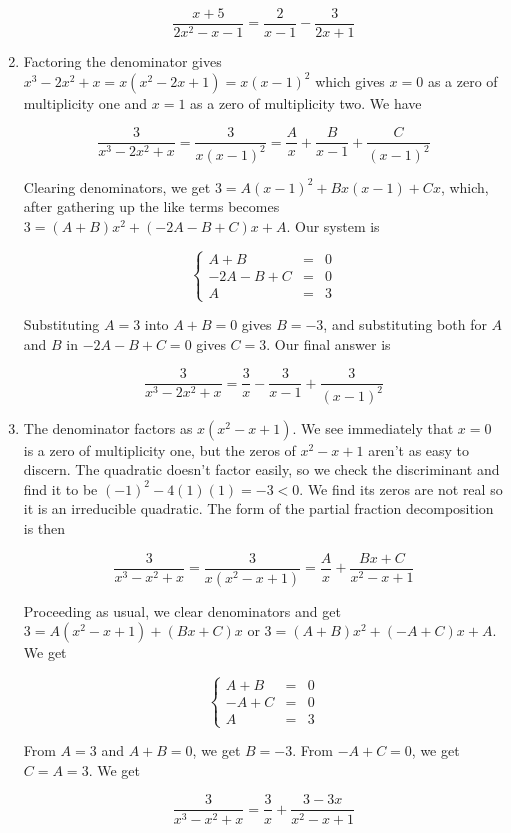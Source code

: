 \begin{ex}
\begin{enumerate}
\[\dfrac{x+5}{2x^2-x-1} = \dfrac{2}{x-1} -\dfrac{3}{2x+1} \]

\item  Factoring the denominator gives $x^3-2x^2+x = x\left(x^2-2x+1\right) = x(x-1)^2$ which gives $x=0$ as a zero of multiplicity one and $x=1$ as a zero of multiplicity two. We have

\[ \dfrac{3}{x^3-2x^2+x} = \dfrac{3}{x(x-1)^2} = \dfrac{A}{x} + \dfrac{B}{x-1} + \dfrac{C}{(x-1)^2} \]

Clearing denominators, we get $3 = A(x-1)^2 + Bx(x-1)+Cx$, which, after gathering up the like terms becomes $3 = (A+B)x^2+(-2A-B+C)x + A$.  Our system is 
 
\[ \left\{ \begin{array}{rcr}  A+B & = & 0 \\ -2A-B+C & = & 0 \\ A & = & 3 \end{array} \right.\]

Substituting $A=3$ into $A+B = 0$ gives $B = -3$, and substituting both for $A$ and $B$ in $-2A-B+C = 0$ gives $C = 3$.  Our final answer is

\[ \dfrac{3}{x^3-2x^2+x} = \dfrac{3}{x} - \dfrac{3}{x-1} + \dfrac{3}{(x-1)^2} \]

\item  The denominator factors as $x\left(x^2-x+1\right)$.  We see immediately that $x=0$ is a zero of multiplicity one, but the zeros of $x^2-x+1$ aren't as easy to discern.  The quadratic doesn't factor easily, so we check the discriminant and find it to be $(-1)^2-4(1)(1) = -3 < 0$.  We find its zeros are not real so it is an irreducible quadratic.  The form of the partial fraction decomposition is then

\[\dfrac{3}{x^3-x^2+x} = \dfrac{3}{x\left(x^2-x+1\right)} = \dfrac{A}{x} + \dfrac{Bx+C}{x^2-x+1}\]

Proceeding as usual, we clear denominators and get $3 = A\left(x^2-x+1\right) + (Bx+C)x$ or $3 = (A+B)x^2 + (-A+C)x +A$.  We get

\[ \left\{ \begin{array}{rcr}  A+B & = & 0 \\ -A+C & = & 0 \\ A & = & 3 \end{array} \right.\]

From $A=3$ and $A+B = 0$, we get $B = -3$.  From $-A+C = 0$, we get $C = A = 3$.  We get


\[\dfrac{3}{x^3-x^2+x} =  \dfrac{3}{x} + \dfrac{3-3x}{x^2-x+1}\]


\end{enumerate}
\end{ex}
